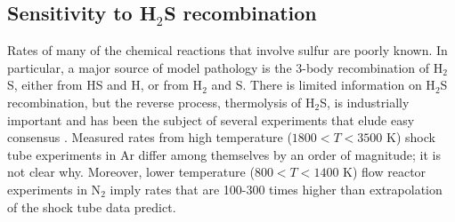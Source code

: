 \documentclass[preprint]{aastex}
\newcounter{reaction}
\begin{document}
\subsection{Sensitivity to H$_2$S recombination}

Rates of many of the chemical reactions that involve sulfur are poorly known.
In particular, a major source of model pathology 
is the 3-body recombination of H$_2$S, either from HS and H, or from H$_2$ and S. 
%   
There is limited information on H$_2$S recombination,
but the reverse process, thermolysis of H$_2$S, is industrially important and
 has been the subject of several experiments that elude easy consensus
 \citep{Bowman1977,Roth1982,Tesner1990,Woiki1994,Woiki1995a,Olschewski1994,Shiina1996,Shiina1998, 
 Karan1999}.
 Measured rates from high temperature ($1800<T<3500$ K) shock tube experiments in Ar
 \citep{Bowman1977,Woiki1994,Woiki1995a,Olschewski1994,Shiina1996,Shiina1998}
 differ among themselves by an order of magnitude; it is not clear why.
 Moreover, lower temperature ($800 < T < 1400$ K) flow reactor experiments in N$_2$ \citep{Tesner1990,Karan1999}
 imply rates that are 100-300 times higher than extrapolation of the shock tube data predict.
  
\end{document}
